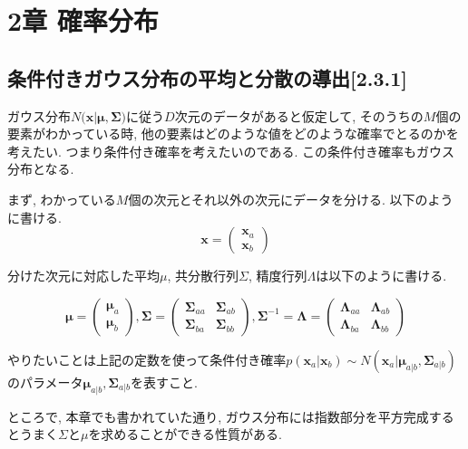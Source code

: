 \section{2章 確率分布}

\subsection{条件付きガウス分布の平均と分散の導出[2.3.1]}

ガウス分布$N(\bm{x}|\bm{\mu}, \bm{\Sigma)}$に従う$D$次元のデータがあると仮定して, そのうちの$M$個の要素がわかっている時, 他の要素はどのような値をどのような確率でとるのかを考えたい. つまり条件付き確率を考えたいのである. この条件付き確率もガウス分布となる.

まず, わかっている$M$個の次元とそれ以外の次元にデータを分ける. 以下のように書ける.
\begin{equation}
    \bm{x} = 
    \begin{pmatrix}
        \bm{x}_a \\
        \bm{x}_b
    \end{pmatrix} \nonumber
\end{equation}

分けた次元に対応した平均$\mu$, 共分散行列$\Sigma$, 精度行列$\Lambda$は以下のように書ける.

\begin{equation}
    \bm{\mu} = 
    \begin{pmatrix}
        \bm{\mu}_a \\
        \bm{\mu}_b
    \end{pmatrix},
    \bm{\Sigma} = 
    \begin{pmatrix}
        \bm{\Sigma}_{aa} & \bm{\Sigma}_{ab} \\
        \bm{\Sigma}_{ba} & \bm{\Sigma}_{bb}
    \end{pmatrix},
    \bm{\Sigma}^{-1} = \bm{\Lambda} = 
    \begin{pmatrix}
        \bm{\Lambda}_{aa} & \bm{\Lambda}_{ab} \\
        \bm{\Lambda}_{ba} & \bm{\Lambda}_{bb}
    \end{pmatrix} \nonumber
\end{equation}

やりたいことは上記の定数を使って条件付き確率$p(\bm{x}_a | \bm{x}_b) \sim N(\bm{x}_a| \bm{\mu}_{a|b}, \bm{\Sigma}_{a|b} )$のパラメータ$\bm{\mu}_{a|b}, \bm{\Sigma}_{a|b}$を表すこと.

ところで, 本章でも書かれていた通り, ガウス分布には指数部分を平方完成するとうまく$\Sigma$と$\mu$を求めることができる性質がある.


